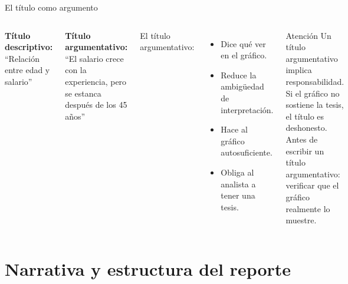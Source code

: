 \documentclass[aspectratio=169]{beamer}
\begin{document}
\begin{frame}{El título como argumento}
  \begin{columns}
      \textbf{Título descriptivo:}\\
      ``Relación entre edad y salario''

      \bigskip
      \textbf{Título argumentativo:}\\
      ``El salario crece con la experiencia, pero se estanca después de los 45 años''

      \bigskip
      El título argumentativo:
      \begin{itemize}
        \item Dice qué ver en el gráfico.
        \item Reduce la ambigüedad de interpretación.
        \item Hace al gráfico autosuficiente.
        \item Obliga al analista a tener una tesis.
      \end{itemize}
      \begin{alertblock}{Atención}
        Un título argumentativo implica responsabilidad. Si el gráfico no sostiene la tesis, el título es deshonesto.\\
        \bigskip
        Antes de escribir un título argumentativo: verificar que el gráfico realmente lo muestre.
      \end{alertblock}
  \end{columns}
\end{frame}

\section{Narrativa y estructura del reporte}
\end{document}
